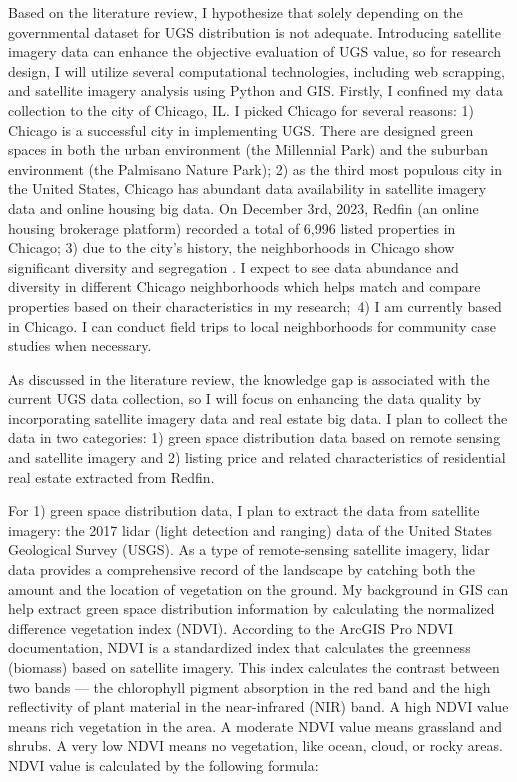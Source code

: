 
Based on the literature review, I hypothesize that solely depending on the governmental dataset for UGS distribution is not adequate. Introducing satellite imagery data can enhance the objective evaluation of UGS value, so for research design, I will utilize several computational technologies, including web scrapping, and satellite imagery analysis using Python and GIS. Firstly, I confined my data collection to the city of Chicago, IL. I picked Chicago for several reasons: 1) Chicago is a successful city in implementing UGS. There are designed green spaces in both the urban environment (the Millennial Park) and the suburban environment (the Palmisano Nature Park); 2) as the third most populous city in the United States, Chicago has abundant data availability in satellite imagery data and online housing big data. On December 3rd, 2023, Redfin (an online housing brokerage platform) recorded a total of 6,996 listed properties in Chicago; 3) due to the city's history, the neighborhoods in Chicago show significant diversity and segregation \parencite{roseman_ethnicity_1996}. I expect to see data abundance and diversity in different Chicago neighborhoods which helps match and compare properties based on their characteristics in my research; 4) I am currently based in Chicago. I can conduct field trips to local neighborhoods for community case studies when necessary.

As discussed in the literature review, the knowledge gap is associated with the current UGS data collection, so I will focus on enhancing the data quality by incorporating satellite imagery data and real estate big data. I plan to collect the data in two categories: 1) green space distribution data based on remote sensing and satellite imagery and 2) listing price and related characteristics of residential real estate extracted from Redfin. 

For 1) green space distribution data, I plan to extract the data from satellite imagery: the 2017 lidar (light detection and ranging) data of the United States Geological Survey (USGS). As a type of remote-sensing satellite imagery, lidar data provides a comprehensive record of the landscape by catching both the amount and the location of vegetation on the ground. My background in GIS can help extract green space distribution information by calculating the normalized difference vegetation index (NDVI). According to the ArcGIS Pro NDVI documentation, NDVI is a standardized index that calculates the greenness (biomass) based on satellite imagery. This index calculates the contrast between two bands — the chlorophyll pigment absorption in the red band and the high reflectivity of plant material in the near-infrared (NIR) band. A high NDVI value means rich vegetation in the area. A moderate NDVI value means grassland and shrubs. A very low NDVI means no vegetation, like ocean, cloud, or rocky areas. NDVI value is calculated by the following formula:

